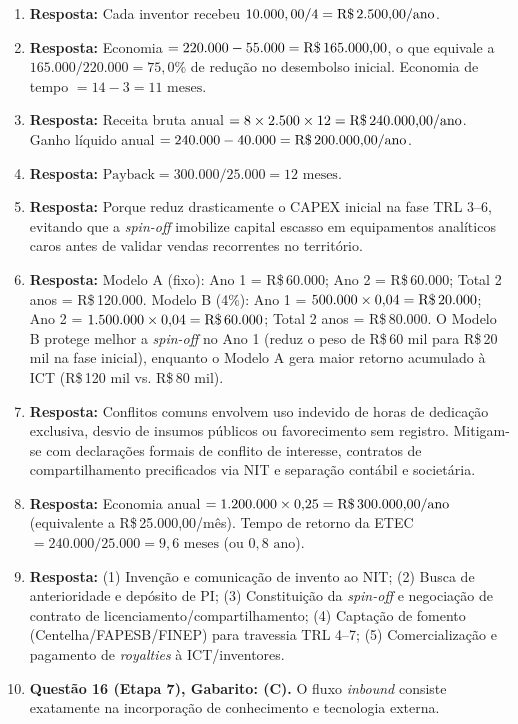 \begin{boxGabarito}
\begin{enumerate}[leftmargin=1.5em, itemsep=4pt]
    \item \textbf{Resposta:} Cada inventor recebeu $10.000,00 / 4 = \text{R\$\,2.500,00/ano}$.
    \item \textbf{Resposta:} Economia $= 220.000 - 55.000 = \text{R\$\,165.000,00}$, o que equivale a $165.000 / 220.000 = 75{,}0\%$ de redução no desembolso inicial. Economia de tempo $= 14 - 3 = 11\text{ meses}$.
    \item \textbf{Resposta:} Receita bruta anual $= 8 \times 2.500 \times 12 = \text{R\$\,240.000,00/ano}$. Ganho líquido anual $= 240.000 - 40.000 = \text{R\$\,200.000,00/ano}$.
    \item \textbf{Resposta:} $\text{Payback} = 300.000 / 25.000 = 12\text{ meses}$.
    \item \textbf{Resposta:} Porque reduz drasticamente o CAPEX inicial na fase TRL 3–6, evitando que a \textit{spin-off} imobilize capital escasso em equipamentos analíticos caros antes de validar vendas recorrentes no território.
    \item \textbf{Resposta:} Modelo A (fixo): Ano 1 = R\$\,60.000; Ano 2 = R\$\,60.000; Total 2 anos = R\$\,120.000. Modelo B (4\%): Ano 1 = $500.000 \times 0{,}04 = \text{R\$\,20.000}$; Ano 2 = $1.500.000 \times 0{,}04 = \text{R\$\,60.000}$; Total 2 anos = R\$\,80.000. O Modelo B protege melhor a \textit{spin-off} no Ano 1 (reduz o peso de R\$\,60 mil para R\$\,20 mil na fase inicial), enquanto o Modelo A gera maior retorno acumulado à ICT (R\$\,120 mil vs. R\$\,80 mil).
    \item \textbf{Resposta:} Conflitos comuns envolvem uso indevido de horas de dedicação exclusiva, desvio de insumos públicos ou favorecimento sem registro. Mitigam-se com declarações formais de conflito de interesse, contratos de compartilhamento precificados via NIT e separação contábil e societária.
    \item \textbf{Resposta:} Economia anual $= 1.200.000 \times 0{,}25 = \text{R\$\,300.000,00/ano}$ (equivalente a R\$\,25.000,00/mês). Tempo de retorno da ETEC $= 240.000 / 25.000 = 9{,}6\text{ meses}$ (ou $0{,}8\text{ ano}$).
    \item \textbf{Resposta:} (1) Invenção e comunicação de invento ao NIT; (2) Busca de anterioridade e depósito de PI; (3) Constituição da \textit{spin-off} e negociação de contrato de licenciamento/compartilhamento; (4) Captação de fomento (Centelha/FAPESB/FINEP) para travessia TRL 4–7; (5) Comercialização e pagamento de \textit{royalties} à ICT/inventores.
    \item \textbf{Questão 16 (Etapa 7), Gabarito: (C).} O fluxo \textit{inbound} consiste exatamente na incorporação de conhecimento e tecnologia externa.

\end{enumerate}
\end{boxGabarito}
